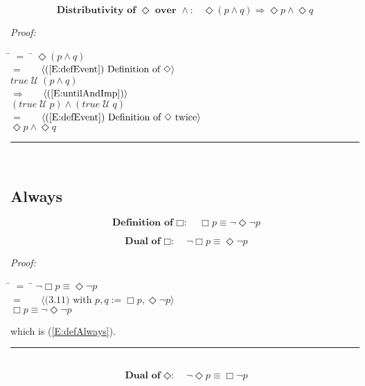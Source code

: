 \documentclass[fleqn, leqno]{article}
\newcommand{\lgap}{2pt}                             %
\newcommand{\mymathindent}{24pt}                    %
\newcommand{\Until}{\;\mathcal{U}\;}
\newcommand{\Event}{\Diamond}
\newcommand{\Always}{\Box}
\newcommand{\myqed}{\hfill\rule[-.23ex]{1.2ex}{2.0ex}}
\newcommand{\Gll} {\langle}                         %
\newcommand{\Ggg} {\rangle}                         %
\newcommand{\Hint}[1]     {\ \ \ $\Gll              \mbox{#1} \Ggg$ }   %
\begin{document}
\begin{equation}\label{E:distEventAnd}
\textbf{Distributivity of $\Event$ over $\land$:}\quad \Event(p \land q) \Rightarrow \Event p \land \Event q
\end{equation}

\emph{Proof:}
\begin{tabbing}
\hspace{\mymathindent} \= $= \;$ \= \kill
  \> \>   $\Event(p \land q)$\\[\lgap]
  \> $=$  \>  \Hint{(\ref{E:defEvent}) Definition of $\Event$}\\[\lgap]
  \> \>   $true \Until (p \land q)$\\[\lgap]
  \> $\Rightarrow$  \>  \Hint{(\ref{E:untilAndImp})}\\[\lgap]
  \> \>   $(true \Until p) \land (true \Until q)$\\[\lgap]
  \> $=$  \>  \Hint{(\ref{E:defEvent}) Definition of $\Event$ twice}\\[\lgap]
  \> \>   $\Event p \land \Event q$\\[\lgap]
\end{tabbing}
\myqed\\[\lgap]

\subsection{Always}

\begin{equation}\label{E:defAlways}
\textbf{Definition of $\Always$:}\quad \Always p \equiv \lnot\Event\lnot p
\end{equation}


\begin{equation}\label{E:dualAlways}
\textbf{Dual of $\Always$:}\quad \lnot\Always p \equiv \Event\lnot p
\end{equation}

\emph{Proof:}
\begin{tabbing}
\hspace{\mymathindent} \= $= \;$ \= \kill
  \> \>   $\lnot\Always p \equiv \Event\lnot p$\\[\lgap]
  \> $=$  \>  \Hint{(3.11) with $p,q := \Always p, \Event\lnot p$}\\[\lgap]
  \> \>   $\Always p \equiv \lnot\Event\lnot p$
\end{tabbing}
which is (\ref{E:defAlways}). \myqed\\[\lgap]


\begin{equation}\label{E:dualEvent}
\textbf{Dual of $\Event$:}\quad \lnot\Event p \equiv \Always\lnot p
\end{equation}
\end{document}
